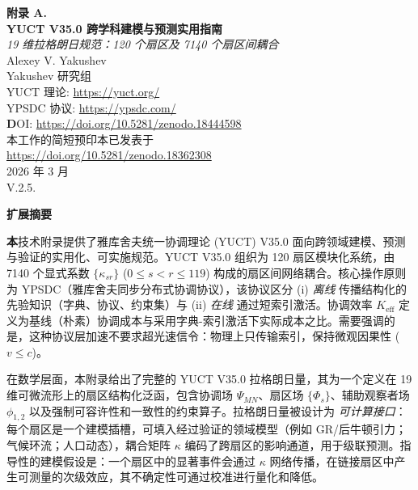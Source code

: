 \documentclass[11pt,a4paper]{article}
\newcommand{\Keff}{K_{\mathrm{eff}}}
\begin{document}
	
	\begin{titlepage}
		\begin{center}
			\vspace*{0.2cm}
			{\Huge\textbf{附录 A. \\
					YUCT V35.0 跨学科建模与预测实用指南}}\\[0.8cm]
			
			{\Large\textit{19 维拉格朗日规范：120 个扇区及 7140 个扇区间耦合}}\\[1.2cm]
			
			{\Large Alexey V. Yakushev}\\[0.3cm]
			{\large Yakushev 研究组}\\
			YUCT 理论: \url{https://yuct.org/}\\
			YPSDC 协议: \url{https://ypsdc.com/}\\
			
			\vspace{2cm}
			\textbf DOI: \url{https://doi.org/10.5281/zenodo.18444598}\\
			
			\vspace{1cm}
			\large 
			本工作的简短预印本已发表于\\ \url{https://doi.org/10.5281/zenodo.18362308}\\
			\vspace{1cm}
			2026 年 3 月 \\ \large V.2.5.
			
			\begin{minipage}{0.92\textwidth}
				\begin{center}\large\textbf{扩展摘要} \\
				\end{center}
				\large\textbf 本技术附录提供了雅库舍夫统一协调理论 (YUCT) V35.0 面向跨领域建模、预测与验证的实用化、可实施规范。YUCT V35.0 组织为 120 扇区模块化系统，由 7140 个显式系数 $\{\kappa_{sr}\}$ ($0\le s<r\le 119$) 构成的扇区间网络耦合。核心操作原则为 YPSDC（雅库舍夫同步分布式协调协议），该协议区分 (i) \emph{离线} 传播结构化的先验知识（字典、协议、约束集）与 (ii) \emph{在线} 通过短索引激活。协调效率 $\Keff$ 定义为基线（朴素）协调成本与采用字典-索引激活下实际成本之比。需要强调的是，这种协议层加速不要求超光速信令：物理上只传输索引，保持微观因果性 ($v\le c$)。
				
				在数学层面，本附录给出了完整的 YUCT V35.0 拉格朗日量，其为一个定义在 19 维可微流形上的扇区结构化泛函，包含协调场 $\Psi_{MN}$、扇区场 $\{\Phi_s\}$、辅助观察者场 $\phi_{1,2}$ 以及强制可容许性和一致性的约束算子。拉格朗日量被设计为 \emph{可计算接口}：每个扇区是一个建模插槽，可填入经过验证的领域模型（例如 GR/后牛顿引力；气候环流；人口动态），耦合矩阵 $\kappa$ 编码了跨扇区的影响通道，用于级联预测。指导性的建模假设是：一个扇区中的显著事件会通过 $\kappa$ 网络传播，在链接扇区中产生可测量的次级效应，其不确定性可通过校准进行量化和降低。
				

\end{minipage}
\end{center}
\end{titlepage}
\end{document}
